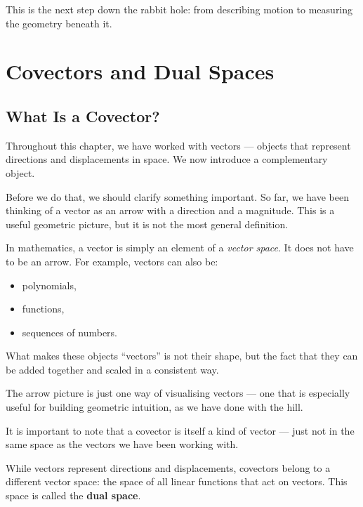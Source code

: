 \documentclass[11pt,openany]{book}
\theoremstyle{definition}
\begin{document}
\medskip

This is the next step down the rabbit hole: from describing motion to measuring the 
geometry beneath it.

\chapter{Covectors and Dual Spaces}

\section{What Is a Covector?}

Throughout this chapter, we have worked with vectors --- objects that represent 
directions and displacements in space. We now introduce a complementary object.

\medskip

Before we do that, we should clarify something important. So far, we have been thinking 
of a vector as an arrow with a direction and a magnitude. This is a useful geometric picture, 
but it is not the most general definition.

\medskip

In mathematics, a vector is simply an element of a \textit{vector space}. It does not have 
to be an arrow. For example, vectors can also be:
\begin{itemize}
  \item polynomials,
  \item functions,
  \item sequences of numbers.
\end{itemize}

\medskip

What makes these objects ``vectors'' is not their shape, but the fact that they can be 
added together and scaled in a consistent way.

\medskip

The arrow picture is just one way of visualising vectors --- one that is especially useful 
for building geometric intuition, as we have done with the hill.

\medskip

\medskip

It is important to note that a covector is itself a kind of vector --- just not in the 
same space as the vectors we have been working with.

\medskip

While vectors represent directions and displacements, covectors belong to a different 
vector space: the space of all linear functions that act on vectors. This space is 
called the \textbf{dual space}.
\end{document}
